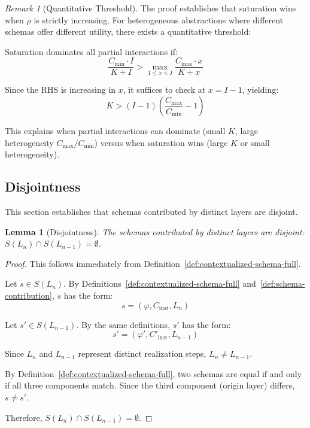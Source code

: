 \documentclass[11pt]{article}
\newtheorem{lemma}[theorem]{Lemma}
\theoremstyle{definition}
\theoremstyle{remark}
\newtheorem{remark}[theorem]{Remark}
\begin{document}
\begin{remark}[Quantitative Threshold]
The proof establishes that saturation wins when $\rho$ is strictly increasing. For heterogeneous
abstractions where different schemas offer different utility, there exists a quantitative threshold:

Saturation dominates all partial interactions if:
\[
\frac{C_{\min} \cdot I}{K + I} > \max_{1 \leq x < I} \frac{C_{\max} \cdot x}{K + x}
\]

Since the RHS is increasing in $x$, it suffices to check at $x = I-1$, yielding:
\[
K > (I-1) \left(\frac{C_{\max}}{C_{\min}} - 1\right)
\]

This explains when partial interactions can dominate (small $K$, large heterogeneity $C_{\max}/C_{\min}$)
versus when saturation wins (large $K$ or small heterogeneity).
\end{remark}

\subsection{Disjointness}
\label{app:disjointness}

This section establishes that schemas contributed by distinct layers are disjoint.

\begin{lemma}[Disjointness]
\label{lem:disjointness}
The schemas contributed by distinct layers are disjoint: $S(L_n) \cap S(L_{n-1}) = \emptyset$.
\end{lemma}

\begin{proof}
This follows immediately from Definition~\ref{def:contextualized-schema-full}.

Let $s \in S(L_n)$. By Definitions~\ref{def:contextualized-schema-full}
and~\ref{def:schema-contribution}, $s$ has the form:
\[
s = (\varphi, C_{\text{inst}}, L_n)
\]

Let $s' \in S(L_{n-1})$. By the same definitions, $s'$ has the form:
\[
s' = (\varphi', C'_{\text{inst}}, L_{n-1})
\]

Since $L_n$ and $L_{n-1}$ represent distinct realization steps, $L_n \neq L_{n-1}$.

By Definition~\ref{def:contextualized-schema-full}, two schemas are equal if and only if all three
components match. Since the third component (origin layer) differs, $s \neq s'$.

Therefore, $S(L_n) \cap S(L_{n-1}) = \emptyset$.
\end{proof}
\end{document}
